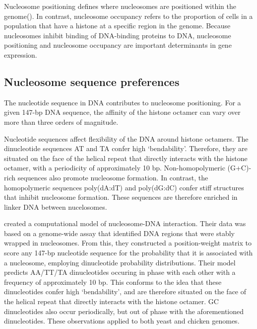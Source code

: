 \documentclass[parskip=full, numbers=noenddot]{scrreprt}
\begin{document}

Nucleosome positioning defines where nucleosomes are positioned within the genome(\cite{struhl_determinants_2013}).
In contrast, nucleosome occupancy refers to the proportion of cells in a population that have a histone at a specific region in the genome. %
Because nucleosomes inhibit binding of DNA-binding proteins to DNA, nucleosome positioning and nucleosome occupancy are important determinants in gene expression. %

\subsection{Nucleosome sequence preferences}
\label{ssec:emsaselex_intro_seqpref}

The nucleotide sequence in DNA contributes to nucleosome positioning.  For a given 147-bp DNA sequence, the affinity of the histone octamer can vary over more than three orders of magnitude.

Nucleotide sequences affect flexibility of the DNA around histone octamers.  The dinucleotide sequences AT and TA confer high `bendability'.  Therefore, they are situated on the face of the helical repeat that directly interacts with the histone octamer, with a periodicity of approximately 10 bp.  Non-homopolymeric (G+C)-rich sequences also promote nucleosome formation.  In contrast, the homopolymeric sequences poly(dA:dT) and poly(dG:dC) confer stiff structures that inhibit nucleosome formation.  These sequences are therefore enriched in linker DNA between nucelosomes.

\cite{segal_genomic_2006}
created a computational model of nucleosome-DNA interaction.  Their data was based on a genome-wide assay that identified DNA regions that were stably wrapped in nucleosomes.  From this, they constructed a position-weight matrix to score any 147-bp nucleotide sequence for the probability that it is associated with a nucleosome, employing dinucleotide probability distributions.  Their model predicts AA/TT/TA dinucleotides occuring in phase with each other with a frequency of approximately 10 bp.  This conforms to the idea that these dinucleotides confer high `bendability', and are therefore situated on the face of the helical repeat that directly interacts with the histone octamer.  GC dinucleotides also occur periodically, but out of phase with the aforementioned dinucleotides.  These observations applied to both yeast and chicken genomes.
\end{document}
